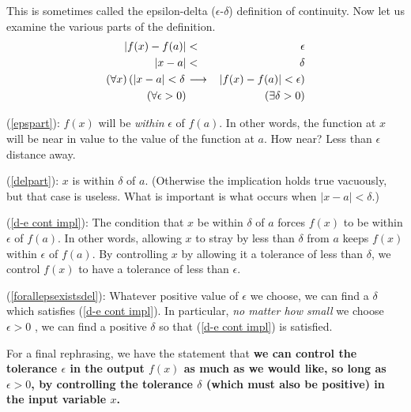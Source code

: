 This is sometimes called the epsilon-delta ($\epsilon$-$\delta$)
definition of continuity.  
 Now let us examine the various parts of the definition.
\begin{eqnarray}
|f(x)-f(a)|&<&\epsilon\label{epspart}\\
|x-a|&<&\delta\label{delpart}\\
(\forall x)
\left(\vphantom{}|x-a|<\delta\right.&
\longrightarrow&
\left.\vphantom{}|f(x)-f(a)|<\epsilon\right)\label{d-e cont impl}\\
(\forall\epsilon>0)&&(\exists\delta>0)\label{forallepsexistsdel}\end{eqnarray}
\begin{description}
\item (\ref{epspart}): $f(x)$ will be {\it within} $\epsilon$ of
$f(a)$.  In other words, the function at $x$ will be near in value to
the value of the function at $a$. How near?  Less than
$\epsilon$ distance away.
\item (\ref{delpart}): $x$ is within $\delta$ of $a$.
(Otherwise the implication holds true vacuously, but that case is useless.
What is important is what occurs when $|x-a|<\delta$.)
\item (\ref{d-e cont impl}): The condition that $x$ be within
$\delta$ of $a$  forces $f(x)$ to be within $\epsilon$ of $f(a)$.
In other words, allowing $x$ to stray by less than $\delta$ from $a$
keeps $f(x)$ within $\epsilon$ of $f(a)$.  By controlling 
$x$ by allowing it a tolerance of less than $\delta$, we control
$f(x)$ to have a tolerance of less than $\epsilon$.
\item (\ref{forallepsexistsdel}): Whatever positive value of $\epsilon$  
we choose, we can find a $\delta$ which satisfies
(\ref{d-e cont impl}).  In particular, {\it no matter how small}
we choose $\epsilon>0$ , we can find a positive $\delta$ so that
(\ref{d-e cont impl}) is satisfied.  
\end{description}
For a final rephrasing, we
have the statement that  
{\bf we can control the tolerance $\epsilon$ in the output $f(x)$ as
much as we would like, so long as $\epsilon>0$, by controlling
the tolerance $\delta$ (which must also be positive\footnotemark)
in the input variable $x$.}  


